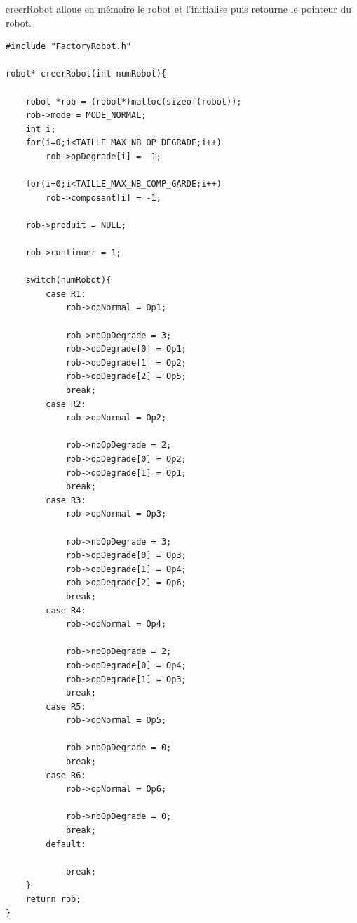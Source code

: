 \documentclass{report}
\begin{document}
creerRobot alloue en mémoire le robot et l'initialise puis retourne le pointeur du robot.
\begin{lstlisting}[caption=Code source de la création des robots]
#include "FactoryRobot.h"

robot* creerRobot(int numRobot){
    
    robot *rob = (robot*)malloc(sizeof(robot));
    rob->mode = MODE_NORMAL;
    int i;
    for(i=0;i<TAILLE_MAX_NB_OP_DEGRADE;i++)
        rob->opDegrade[i] = -1;
    
    for(i=0;i<TAILLE_MAX_NB_COMP_GARDE;i++)
        rob->composant[i] = -1;
    
    rob->produit = NULL;
    
    rob->continuer = 1;
    
    switch(numRobot){
        case R1:
            rob->opNormal = Op1;
            
            rob->nbOpDegrade = 3;
            rob->opDegrade[0] = Op1;
            rob->opDegrade[1] = Op2;
            rob->opDegrade[2] = Op5;
            break;
        case R2:
            rob->opNormal = Op2;
            
            rob->nbOpDegrade = 2;
            rob->opDegrade[0] = Op2;
            rob->opDegrade[1] = Op1;
            break;
        case R3:
            rob->opNormal = Op3;
            
            rob->nbOpDegrade = 3;
            rob->opDegrade[0] = Op3;
            rob->opDegrade[1] = Op4;
            rob->opDegrade[2] = Op6;
            break;
        case R4:
            rob->opNormal = Op4;
            
            rob->nbOpDegrade = 2;
            rob->opDegrade[0] = Op4;
            rob->opDegrade[1] = Op3;
            break;
        case R5:
            rob->opNormal = Op5;
            
            rob->nbOpDegrade = 0;
            break;
        case R6:
            rob->opNormal = Op6;
            
            rob->nbOpDegrade = 0;
            break;
        default:
            
            break;
    }
    return rob;
}
\end{lstlisting}
\end{document}
